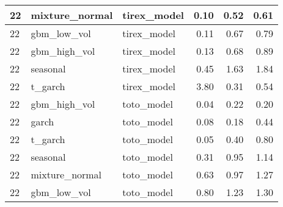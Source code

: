{\begin{tabular}{lllrrr}
\midrule
22 & mixture\_normal & tirex\_model & 0.10 & 0.52 & 0.61 \\
\midrule
22 & gbm\_low\_vol & tirex\_model & 0.11 & 0.67 & 0.79 \\
\midrule
22 & gbm\_high\_vol & tirex\_model & 0.13 & 0.68 & 0.89 \\
\midrule
22 & seasonal & tirex\_model & 0.45 & 1.63 & 1.84 \\
\midrule
22 & t\_garch & tirex\_model & 3.80 & 0.31 & 0.54 \\
\midrule
22 & gbm\_high\_vol & toto\_model & 0.04 & 0.22 & 0.20 \\
\midrule
22 & garch & toto\_model & 0.08 & 0.18 & 0.44 \\
\midrule
22 & t\_garch & toto\_model & 0.05 & 0.40 & 0.80 \\
\midrule
22 & seasonal & toto\_model & 0.31 & 0.95 & 1.14 \\
\midrule
22 & mixture\_normal & toto\_model & 0.63 & 0.97 & 1.27 \\
\midrule
22 & gbm\_low\_vol & toto\_model & 0.80 & 1.23 & 1.30 \\
\bottomrule
\end{tabular}
}
